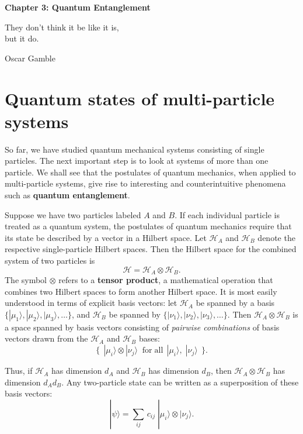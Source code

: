 \documentclass[pra,12pt]{revtex4}
\begin{document}
\setcounter{page}{38}

\begin{center}
{\Large \textbf{Chapter 3: Quantum Entanglement}}
\end{center}

\epigraph{They don't think it be like it is, \\but it do.}{Oscar Gamble}

\section{Quantum states of multi-particle systems}
\label{sec:tensorprod}

So far, we have studied quantum mechanical systems consisting of
single particles.  The next important step is to look at systems of
more than one particle.  We shall see that the postulates of quantum
mechanics, when applied to multi-particle systems, give rise to
interesting and counterintuitive phenomena such as \textbf{quantum
  entanglement}.

Suppose we have two particles labeled $A$ and $B$.  If each individual
particle is treated as a quantum system, the postulates of quantum
mechanics require that its state be described by a vector in a Hilbert
space.  Let $\mathscr{H}_A$ and $\mathscr{H}_B$ denote the respective
single-particle Hilbert spaces.  Then the Hilbert space for the
combined system of two particles is
\begin{equation}
  \mathscr{H} = \mathscr{H}_A\otimes \mathscr{H}_B.
\end{equation}
The symbol $\otimes$ refers to a \textbf{tensor product}, a
mathematical operation that combines two Hilbert spaces to form
another Hilbert space.  It is most easily understood in terms of
explicit basis vectors: let $\mathscr{H}_A$ be spanned by a basis
$\{|\mu_1\rangle, |\mu_2\rangle, |\mu_3\rangle, \dots\}$, and
$\mathscr{H}_B$ be spanned by $\{|\nu_1\rangle, |\nu_2\rangle,
|\nu_3\rangle, \dots\}$.  Then $\mathscr{H}_A \otimes \mathscr{H}_B$
is a space spanned by basis vectors consisting of \textit{pairwise
  combinations} of basis vectors drawn from the $\mathscr{H}_A$ and
$\mathscr{H}_B$ bases:
\begin{equation}
  \Big\{\;\,|\mu_i\rangle\otimes|\nu_j\rangle \;\;  \textrm{for} \; \textrm{all}\;\,|\mu_i\rangle,\; |\nu_j\rangle \;\,\Big\}.
\end{equation}

Thus, if $\mathscr{H}_A$ has dimension $d_A$ and $\mathscr{H}_B$ has
dimension $d_B$, then $\mathscr{H}_A\otimes \mathscr{H}_B$ has
dimension $d_A d_B$.  Any two-particle state can be written as a
superposition of these basis vectors:
\begin{equation}
  |\psi\rangle = \sum_{ij} \, c_{ij}\; |\mu_i\rangle \otimes |\nu_j\rangle.
\end{equation}
\end{document}
